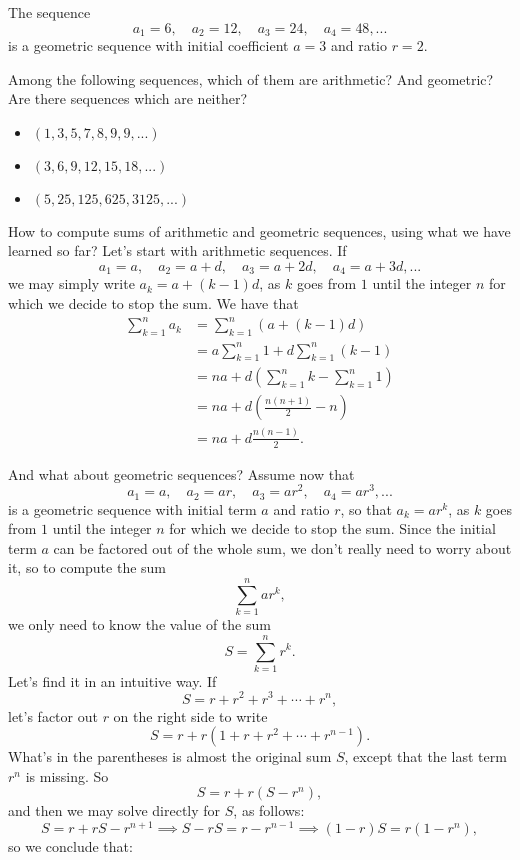 \documentclass[nooutcomes]{ximera}
\begin{document}
\begin{example}
  The sequence $$a_1 = 6, \quad a_2 = 12, \quad a_3 = 24, \quad a_4 = 48,...$$is a geometric sequence with initial coefficient $a=3$ and ratio $r=2$.
\end{example}

\begin{exploration}
  Among the following sequences, which of them are arithmetic? And geometric? Are there sequences which are neither?

  \begin{itemize}
  \item $(1,3,5,7,8,9,9,...)$
  \item $(3,6,9,12,15,18,...)$
  \item $(5,25,125,625,3125,...)$
  \end{itemize}
\end{exploration}

How to compute sums of arithmetic and geometric sequences, using what we have learned so far? Let's start with arithmetic sequences. If $$a_1 = a, \quad a_2 = a+d, \quad a_3 = a+2d, \quad a_4 = a+3d,...$$we may simply write $a_k = a+(k-1)d$, as $k$ goes from $1$ until the integer $n$ for which we decide to stop the sum.  We have that
\begin{align*}
  \sum_{k=1}^n a_k &= \sum_{k=1}^n (a+(k-1)d)  \\  &= a\sum_{k=1}^n1 + d\sum_{k=1}^n(k-1) \\ &= na + d\left(\sum_{k=1}^n k -\sum_{k=1}^n1\right)\\ &= na + d\left(\frac{n(n+1)}{2}-n\right) \\ &= na + d\frac{n(n-1)}{2}.
\end{align*}

And what about geometric sequences? Assume now that $$a_1 = a, \quad a_2=ar,\quad a_3 = ar^2,\quad a_4 = ar^3, ...$$is a geometric sequence with initial term $a$ and ratio $r$, so that $a_k = ar^k$, as $k$ goes from $1$ until the integer $n$ for which we decide to stop the sum. Since the initial term $a$ can be factored out of the whole sum, we don't really need to worry about it, so to compute the sum $$\sum_{k=1}^n ar^k,$$we only need to know the value of the sum $$S=\sum_{k=1}^n r^k.$$Let's find it in an intuitive way. If $$S = r+r^2+r^3+\cdots + r^n,$$let's factor out $r$ on the right side to write $$S =r+ r(1+r+r^2+\cdots + r^{n-1}).$$What's in the parentheses is almost the original sum $S$, except that the last term $r^n$ is missing. So $$S = r+r(S-r^n),$$and then we may solve directly for $S$, as follows: $$S = r+rS - r^{n+1} \implies S-rS = r-r^{n-1} \implies (1-r)S = r(1-r^n),$$so we conclude that:
\end{document}
